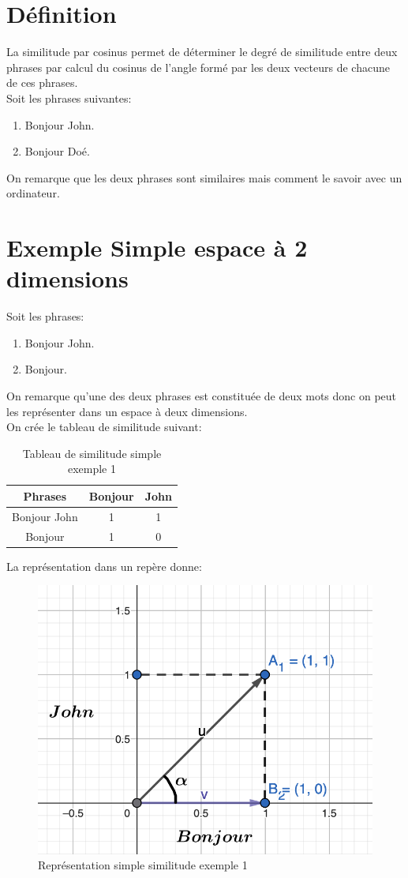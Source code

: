 \documentclass[a4paper, 14pt]{article}
\author{Tuo Ismaël Maurice}
\date{14/04/2025}
\begin{document}
	\section{Définition}
	La similitude par cosinus permet de déterminer le degré de similitude entre deux phrases par calcul du cosinus de l'angle formé par les deux vecteurs de chacune de ces phrases.\\
	Soit les phrases suivantes:
	\begin{enumerate}
		\item Bonjour John.
		\item Bonjour Doé.
	\end{enumerate}
	On remarque que les deux phrases sont similaires mais comment le savoir avec un ordinateur.

	\section{Exemple Simple espace à 2 dimensions}
	Soit les phrases:
	\begin{enumerate}
		\item Bonjour John.
		\item Bonjour.
	\end{enumerate}
	On remarque qu'une des deux phrases est constituée  de deux mots donc on peut les représenter dans un espace à deux dimensions.\\
	On crée le tableau de similitude suivant:
	\begin{table}[H]
		\centering
		\begin{tabular}{|c|c|c|}
			\hline
			\textbf{Phrases} & \textbf{Bonjour} & \textbf{John} \\
			\hline
			Bonjour John & 1 & 1 \\
			Bonjour & 1 & 0 \\
			\hline
		\end{tabular}
		\caption{Tableau de similitude simple exemple 1}
		\label{tab:exemplesimple}
	\end{table}
	La représentation dans un repère donne:
	 \begin{figure}[H]
		\includegraphics[scale=0.5, width=15cm]{./img/vecteur_exemple_simple.png}
		\caption{Représentation simple similitude exemple 1}
	\end{figure}
\end{document}
